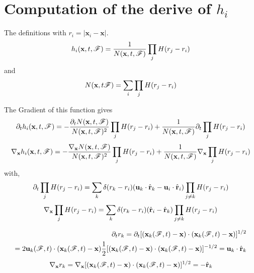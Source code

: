 \section{Computation of the derive of $h_i$}
\label{ap:computationof_h}

The definitions with $r_i = |\textbf{x}_i - \textbf{x}|$.  
\begin{equation*}
    h_i(\textbf{x},t,\mathscr{F})
    = 
    \frac{1}{N(\textbf{x},t,\mathscr{F})}
    \prod_j
    H(r_j - r_i)
\end{equation*}
and 
\begin{equation*}
    N(\textbf{x},t\mathscr{F})
    = \sum_i \prod_j 
    H(r_j - r_i)
\end{equation*}

The Gradient of this function gives
\begin{equation*}
    \partial_t  h_i(\textbf{x},t,\mathscr{F})
    = 
    -  \frac{\partial_t N(\textbf{x},t,\mathscr{F})}{N(\textbf{x},t,\mathscr{F})^2}
    \prod_j
    H(r_j - r_i)
    + \frac{1}{N(\textbf{x},t,\mathscr{F})}
    \partial_t \prod_j
    H(r_j - r_i)
\end{equation*}
\begin{equation*}
    {\mathbf{\nabla}_\textbf{x}}  h_i(\textbf{x},t,\mathscr{F})
    = 
    -  \frac{{\mathbf{\nabla}_\textbf{x}} N(\textbf{x},t,\mathscr{F})}{N(\textbf{x},t,\mathscr{F})^2}
    \prod_j
    H(r_j - r_i)
    + \frac{1}{N(\textbf{x},t,\mathscr{F})}
    {\mathbf{\nabla}_\textbf{x}} \prod_j
    H(r_j - r_i)
\end{equation*}
with, 
\begin{equation*}
    \partial_t 
    \prod_j
    H(r_j - r_i)
    = 
    \sum_k 
    \delta(r_k - r_i)
    (\textbf{u}_k  \cdot \hat{\textbf{r}}_k - \textbf{u}_i  \cdot \hat{\textbf{r}}_i)
    \prod_{j\neq k}
    H(r_j - r_i)
\end{equation*}
\begin{equation*}
    {\mathbf{\nabla}_\textbf{x}}
    \prod_j
    H(r_j - r_i)
    = 
    \sum_k 
    \delta(r_k - r_i)
    ( \hat{\textbf{r}}_i -  \hat{\textbf{r}}_k)
    \prod_{j\neq k}
    H(r_j - r_i)
\end{equation*}

\begin{align*}
    \partial_t r_k
    = \partial_t [(\textbf{x}_k(\mathscr{F},t) - \textbf{x})\cdot (\textbf{x}_k(\mathscr{F},t) - \textbf{x})]^{1/2}\\
    = 
    2 \textbf{u}_k(\mathscr{F},t)  \cdot (\textbf{x}_k(\mathscr{F},t) - \textbf{x})
    \frac{1}{2}[(\textbf{x}_k(\mathscr{F},t) - \textbf{x})\cdot (\textbf{x}_k(\mathscr{F},t) - \textbf{x})]^{- 1/2}
    = 
    \textbf{u}_k  \cdot \hat{\textbf{r}}_k
\end{align*}
\begin{align*}
    {\mathbf{\nabla}_\textbf{x}} r_k
    = {\mathbf{\nabla}_\textbf{x}} [(\textbf{x}_k(\mathscr{F},t) - \textbf{x})\cdot (\textbf{x}_k(\mathscr{F},t) - \textbf{x})]^{1/2}
    = - \hat{\textbf{r}}_k
\end{align*}

